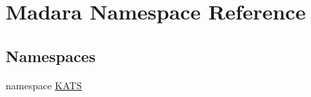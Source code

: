 \hypertarget{namespaceMadara}{
\section{Madara Namespace Reference}
\label{d8/da1/namespaceMadara}
}
\subsection*{Namespaces}
\begin{DoxyCompactItemize}
\item 
namespace \hyperlink{namespaceMadara_1_1KATS}{KATS}
\end{DoxyCompactItemize}
